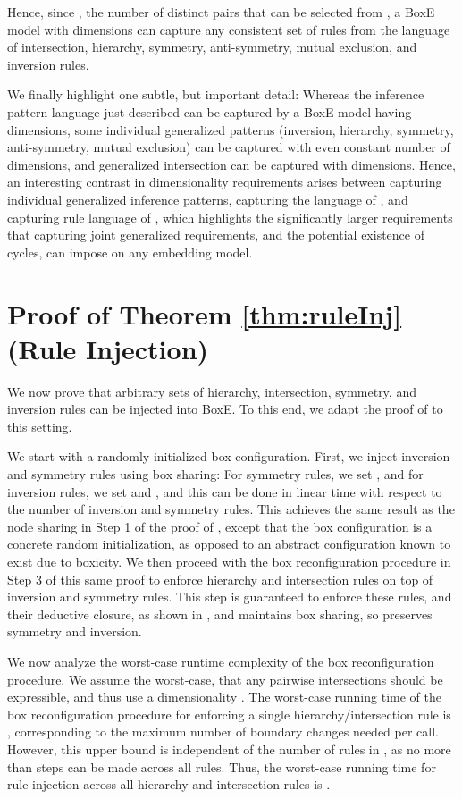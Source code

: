 \documentclass{article}
\begin{document}
Hence, since , the number of distinct pairs that can be selected from \Rbf, a BoxE model with  dimensions can capture any consistent set of rules  from the language of intersection, hierarchy, symmetry, anti-symmetry, mutual exclusion, and inversion rules.   


We finally highlight one subtle, but important detail: Whereas the inference pattern language just described can be captured by a BoxE model having  dimensions, some individual generalized patterns (inversion, hierarchy, symmetry, anti-symmetry, mutual exclusion) can be captured with even constant number of dimensions, and generalized intersection can be captured with  dimensions. Hence, an interesting contrast in dimensionality requirements arises between capturing individual generalized inference patterns, capturing the language of , and capturing rule language of , which highlights the significantly larger requirements that capturing joint generalized requirements, and the potential existence of cycles, can impose on any embedding model. 



\section{Proof of Theorem \ref{thm:ruleInj} (Rule Injection)}
\label{app:ruleInj}

We now prove that arbitrary sets  of hierarchy, intersection, symmetry, and inversion rules can be injected into BoxE. To this end, we adapt the proof of  to this setting.

We start with a randomly initialized box configuration. First, we inject inversion and symmetry rules using box sharing: For symmetry rules, we set , and for inversion rules, we set  and , and this can be done in linear time with respect to the number of inversion and symmetry rules. This achieves the same result as the node sharing in Step 1 of the proof of , except that the box configuration is a concrete random initialization, as opposed to an abstract configuration known to exist due to boxicity. We then proceed with the box reconfiguration procedure in Step 3 of this same proof to enforce hierarchy and intersection rules on top of inversion and symmetry rules. This step is guaranteed to enforce these rules, and their deductive closure, as shown in , and maintains box sharing, so preserves symmetry and inversion. 

We now analyze the worst-case runtime complexity of the box reconfiguration procedure. We assume the worst-case, that any pairwise intersections should be expressible, and thus use a dimensionality . The worst-case running time of the box reconfiguration procedure 
for enforcing a single hierarchy/intersection rule is , corresponding to the maximum number of boundary changes needed per call. However, this upper bound is independent of the number of rules in , as no more than  steps can be made across all rules. Thus, the worst-case running time for rule injection across all hierarchy and intersection rules is . 
\end{document}
